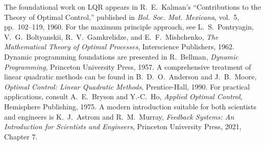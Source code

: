 The foundational work on LQR appears in R.~E.~Kalman's ``Contributions to the Theory of Optimal Control,'' published in \textit{Bol. Soc. Mat. Mexicana}, vol.~5, pp.~102--119, 1960. For the maximum principle approach, see L.~S.~Pontryagin, V.~G.~Boltyanskii, R.~V.~Gamkrelidze, and E.~F.~Mishchenko, \textit{The Mathematical Theory of Optimal Processes}, Interscience Publishers, 1962. Dynamic programming foundations are presented in R.~Bellman, \textit{Dynamic Programming}, Princeton University Press, 1957. A comprehensive treatment of linear quadratic methods can be found in B.~D.~O.~Anderson and J.~B.~Moore, \textit{Optimal Control: Linear Quadratic Methods}, Prentice-Hall, 1990. For practical applications, consult A.~E.~Bryson and Y.-C.~Ho, \textit{Applied Optimal Control}, Hemisphere Publishing, 1975. A modern introduction suitable for both scientists and engineers is K.~J.~Astrom and R.~M.~Murray, \textit{Feedback Systems: An Introduction for Scientists and Engineers}, Princeton University Press, 2021, Chapter 7.

